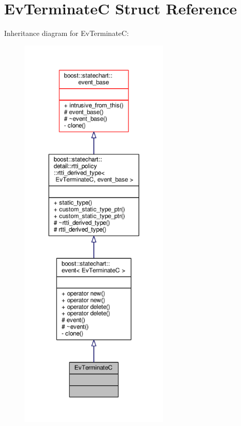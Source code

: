 \hypertarget{struct_ev_terminate_c}{}\section{Ev\+TerminateC Struct Reference}
\label{struct_ev_terminate_c}


Inheritance diagram for Ev\+TerminateC\+:
\nopagebreak
\begin{figure}[H]
\begin{center}
\leavevmode
\includegraphics[height=550pt]{struct_ev_terminate_c__inherit__graph}
\end{center}
\end{figure}


